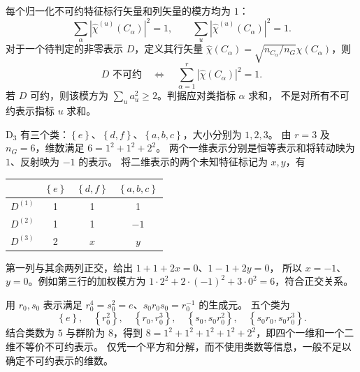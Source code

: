 每个归一化不可约特征标行矢量和列矢量的模方均为 $1$：
\begin{equation}
\sum_\alpha|\hat\chi^{\left(u\right)}\left(C_\alpha\right)|^2=1,\qquad
\sum_u|\hat\chi^{\left(u\right)}\left(C_\alpha\right)|^2=1.
\end{equation}
对于一个待判定的非零表示 $D$，定义其行矢量
$\hat\chi\left(C_\alpha\right)=\sqrt{n_{C_\alpha}/n_G}\chi\left(C_\alpha\right)$，则
\begin{equation}
D\text{ 不可约}\quad\Longleftrightarrow\quad
\sum_{\alpha=1}^{r}|\hat\chi\left(C_\alpha\right)|^2=1.
\end{equation}
若 $D$ 可约，则该模方为 $\sum_u a_u^2\geq2$。判据应对类指标 $\alpha$ 求和，
不是对所有不可约表示指标 $u$ 求和。

\begin{example}
$\mathrm{D}_3$ 有三个类：$\left\{e\right\}$、$\left\{d,f\right\}$、$\left\{a,b,c\right\}$，大小分别为 $1,2,3$。
由 $r=3$ 及 $n_G=6$，维数满足 $6=1^2+1^2+2^2$。
两个一维表示分别是恒等表示和将转动映为 $1$、反射映为 $-1$ 的表示。
将二维表示的两个未知特征标记为 $x,y$，有
\begin{center}
\begin{tabular}{c|ccc}
\toprule
 & $\left\{e\right\}$ & $\left\{d,f\right\}$ & $\left\{a,b,c\right\}$\\\midrule
$D^{\left(1\right)}$ & 1 & 1 & 1\\
$D^{\left(2\right)}$ & 1 & 1 & $-1$\\
$D^{\left(3\right)}$ & 2 & $x$ & $y$\\\bottomrule
\end{tabular}
\end{center}
第一列与其余两列正交，给出 $1+1+2x=0$、$1-1+2y=0$，
所以 $x=-1$、$y=0$。例如第三行的加权模方为
$1\cdot2^2+2\cdot\left(-1\right)^2+3\cdot0^2=6$，符合正交关系。
\end{example}

\begin{example}
用 $r_0,s_0$ 表示满足 $r_0^4=s_0^2=e$、$s_0r_0s_0=r_0^{-1}$ 的生成元。
五个类为
\begin{equation}
\left\{e\right\},\quad\left\{r_0^2\right\},\quad\left\{r_0,r_0^3\right\},\quad
\left\{s_0,s_0r_0^2\right\},\quad\left\{s_0r_0,s_0r_0^3\right\}.
\end{equation}
结合类数为 $5$ 与群阶为 $8$，得到
$8=1^2+1^2+1^2+1^2+2^2$，即四个一维和一个二维不等价不可约表示。
仅凭一个平方和分解，而不使用类数等信息，一般不足以确定不可约表示的维数。
\end{example}

